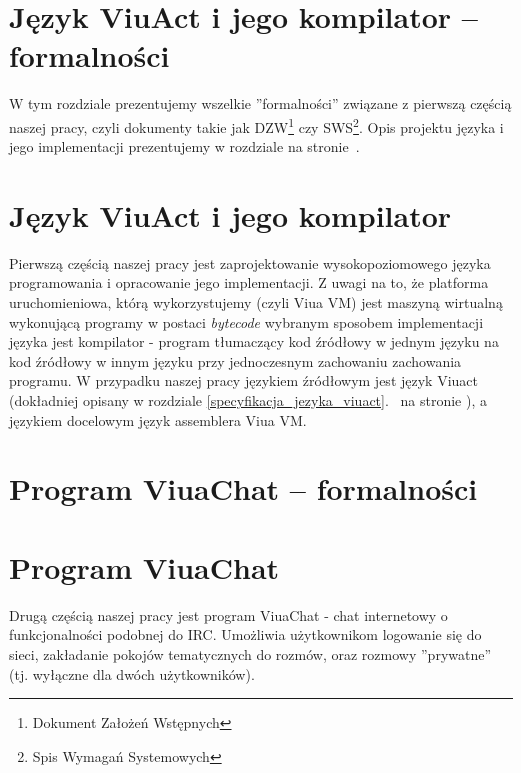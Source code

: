 \documentclass[11pt,oneside,a4paper,titlepage,onecolumn]{book}
\begin{document}
\chapter{Język ViuAct i jego kompilator -- formalności}

W tym rozdziale prezentujemy wszelkie ''formalności'' związane z pierwszą częścią naszej pracy, czyli
dokumenty takie jak DZW\footnote{Dokument Założeń Wstępnych} czy SWS\footnote{Spis Wymagań Systemowych}.
Opis projektu języka i jego implementacji prezentujemy w rozdziale  na
stronie~\pageref{jezyk_viuact_i_jego_kompilator}.



\chapter{Język ViuAct i jego kompilator}
\label{jezyk_viuact_i_jego_kompilator}

Pierwszą częścią naszej pracy jest zaprojektowanie wysokopoziomowego języka programowania i opracowanie jego
implementacji. Z uwagi na to, że platforma uruchomieniowa, którą wykorzystujemy (czyli Viua VM) jest maszyną
wirtualną wykonującą programy w postaci \emph{bytecode} wybranym sposobem implementacji języka jest
kompilator - program tłumaczący kod źródłowy w jednym języku na kod źródłowy w innym języku przy jednoczesnym
zachowaniu zachowania programu. W przypadku naszej pracy językiem źródłowym jest język Viuact (dokładniej
opisany w rozdziale \ref{specyfikacja_jezyka_viuact}.~ na stronie
\pageref{specyfikacja_jezyka_viuact}), a językiem docelowym język assemblera Viua VM.







\chapter{Program ViuaChat -- formalności}



\chapter{Program ViuaChat}
\label{program_viuachat}

Drugą częścią naszej pracy jest program ViuaChat - chat internetowy o funkcjonalności podobnej do IRC.
Umożliwia użytkownikom logowanie się do sieci, zakładanie pokojów tematycznych do rozmów, oraz rozmowy
''prywatne'' (tj. wyłączne dla dwóch użytkowników).
\end{document}
